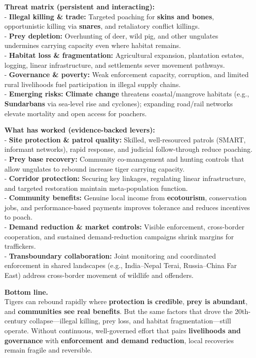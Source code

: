\documentclass[
]{article}
\begin{document}
\textbf{Threat matrix (persistent and interacting):}\\
- \textbf{Illegal killing \& trade:} Targeted poaching for \textbf{skins
and bones}, opportunistic killing via \textbf{snares}, and retaliatory
conflict killings.\\
- \textbf{Prey depletion:} Overhunting of deer, wild pig, and other
ungulates undermines carrying capacity even where habitat remains.\\
- \textbf{Habitat loss \& fragmentation:} Agricultural expansion,
plantation estates, logging, linear infrastructure, and settlements
sever movement pathways.\\
- \textbf{Governance \& poverty:} Weak enforcement capacity, corruption,
and limited rural livelihoods fuel participation in illegal supply
chains.\\
- \textbf{Emerging risks:} \textbf{Climate change} threatens
coastal/mangrove habitats (e.g., \textbf{Sundarbans} via sea-level rise
and cyclones); expanding road/rail networks elevate mortality and open
access for poachers.

\textbf{What has worked (evidence-backed levers):}\\
- \textbf{Site protection \& patrol quality:} Skilled, well-resourced
patrols (SMART, informant networks), rapid response, and judicial
follow-through reduce poaching.\\
- \textbf{Prey base recovery:} Community co-management and hunting
controls that allow ungulates to rebound increase tiger carrying
capacity.\\
- \textbf{Corridor protection:} Securing key linkages, regulating linear
infrastructure, and targeted restoration maintain meta-population
function.\\
- \textbf{Community benefits:} Genuine local income from
\textbf{ecotourism}, conservation jobs, and performance-based payments
improves tolerance and reduces incentives to poach.\\
- \textbf{Demand reduction \& market controls:} Visible enforcement,
cross-border cooperation, and sustained demand-reduction campaigns
shrink margins for traffickers.\\
- \textbf{Transboundary collaboration:} Joint monitoring and coordinated
enforcement in shared landscapes (e.g., India--Nepal Terai,
Russia--China Far East) address cross-border movement of wildlife and
offenders.

\textbf{Bottom line.}\\
Tigers can rebound rapidly where \textbf{protection is credible},
\textbf{prey is abundant}, and \textbf{communities see real benefits}.
But the same factors that drove the 20th-century collapse---illegal
killing, prey loss, and habitat fragmentation---still operate. Without
continuous, well-governed effort that pairs \textbf{livelihoods and
governance} with \textbf{enforcement and demand reduction}, local
recoveries remain fragile and reversible.
\end{document}
